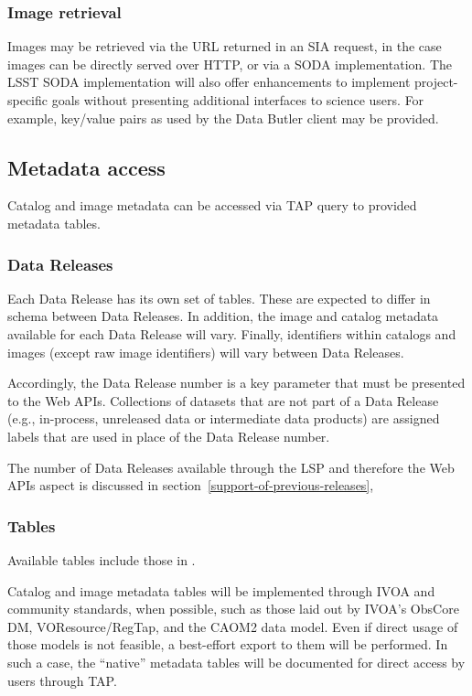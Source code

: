 \subsubsection{Image retrieval}\label{image-retrieval}

Images may be retrieved via the URL returned in an SIA request, in the case
images can be directly served over HTTP, or via a SODA implementation. The LSST
SODA implementation will also offer enhancements to implement project-specific
goals without presenting additional interfaces to science users. For example,
key/value pairs as used by the Data Butler client may be provided.

\subsection{Metadata access}\label{metadata-access}

Catalog and image metadata can be accessed via TAP query to provided
metadata tables.

\subsubsection{Data Releases}\label{data-releases}

Each Data Release has its own set of tables.  These are expected to differ in
schema between Data Releases.  In addition, the image and catalog metadata
available for each Data Release will vary.  Finally, identifiers within
catalogs and images (except raw image identifiers) will vary between Data
Releases.

Accordingly, the Data Release number is a key parameter that must be
presented to the Web APIs.  Collections of datasets that are not part of
a Data Release (e.g., in-process, unreleased data or intermediate data
products) are assigned labels that are used in place of the Data Release
number.

The number of Data Releases available through the LSP and therefore the Web
APIs aspect is discussed in section~\ref{support-of-previous-releases},

\subsubsection{Tables}\label{tables}

Available tables include those in .

Catalog and image metadata tables will be implemented through IVOA and
community standards, when possible, such as those laid out by IVOA's ObsCore
DM, VOResource/RegTap, and the CAOM2 data model. Even if direct usage of those
models is not feasible, a best-effort export to them will be performed.  In
such a case, the ``native'' metadata tables will be documented for direct access
by users through TAP.

